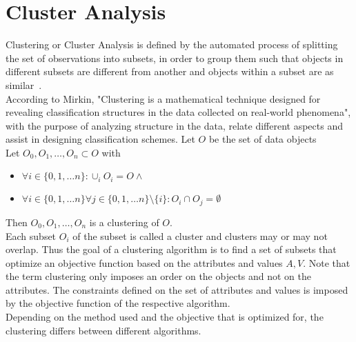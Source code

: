 \section{Cluster Analysis}\label{\positionnumber}
Clustering or Cluster Analysis is defined by the automated process of splitting the set of observations into subsets, in order to group them such that objects in different subsets are different from another and objects within a subset are as similar~\cite{han2011data}. \\
According to Mirkin, "Clustering is a mathematical technique designed for revealing classification structures in the data collected on real-world phenomena"\cite{mirkin2013mathematical}, with the purpose of analyzing structure in the data, relate different aspects and assist in designing classification schemes. 
Let $O$  be the set of data objects \\
Let $O_0, O_1, \dots, O_n \subset O$ with
\begin{itemize}
    \item $\forall i \in \{0, 1, \dots n\}: \cup_i O_i = O \wedge$
    \item $\forall i \in \{0, 1, \dots n\} \forall j \in \{0, 1, \dots n\}\setminus\{i\}: O_i \cap O_j =\emptyset$
\end{itemize}
Then $O_0, O_1, \dots, O_n$ is a clustering of $O$. \\
Each subset $O_i$ of the subset is called a cluster and clusters may or may not overlap. Thus the goal of a clustering algorithm is to find a set of subsets that optimize an objective function based on the attributes and values $A, V$. Note that the term clustering only imposes an order on the objects and not on the attributes. The constraints defined on the set of attributes and values is imposed by the objective function of the respective algorithm. \\

Depending on the method used and the objective that is optimized for, the clustering differs between different algorithms. \\


